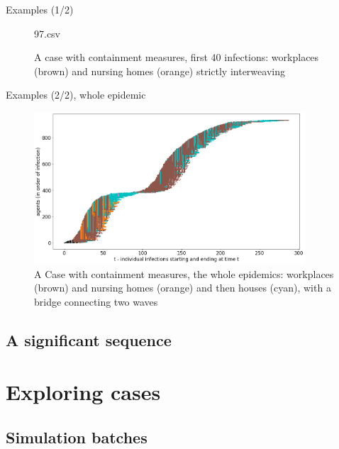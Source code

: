 \documentclass[8pt]{beamer}
\begin{document}
\begin{frame}{Examples (1/2)}
\begin{figure}[H]
97.csv
\caption{A case with containment measures, first 40 infections: workplaces (brown) and nursing homes (orange) strictly interweaving}
\label{workplacesNursingHomes}
\end{figure}
\end{frame}

\begin{frame}{Examples (2/2), whole epidemic}

\begin{figure}[H]
\center
\includegraphics[width=0.9\textwidth]{with8a.png}%
\caption{A Case with containment measures, the whole epidemics: workplaces (brown) and nursing homes (orange) and then houses (cyan), with a bridge connecting two waves}
\label{workplacesNursingHomes}
\end{figure}


\end{frame}


\subsection{A significant sequence}

\section{Exploring cases}

\subsection{Simulation batches}
\end{document}
